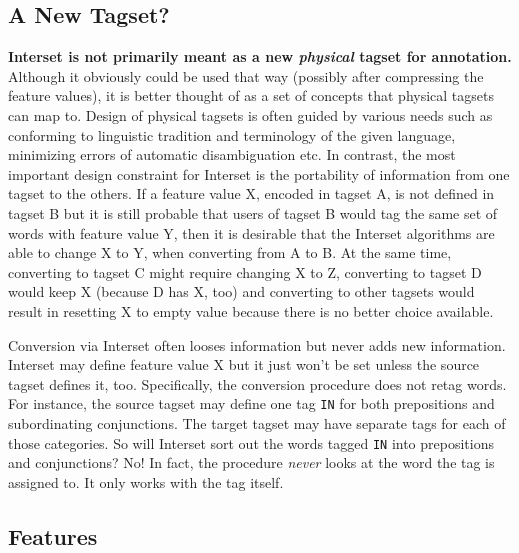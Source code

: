 \documentclass[11pt]{article}
\begin{document}
\subsection{A New Tagset?}
\label{sec:notatagset}

\textbf{Interset is not primarily meant as a new \textit{physical} tagset for annotation.} Although it obviously could be used that way (possibly after compressing the feature values), it is better thought of as a set of concepts that physical tagsets can map to. Design of physical tagsets is often guided by various needs such as conforming to linguistic tradition and terminology of the given language, minimizing errors of automatic disambiguation etc. In contrast, the most important design constraint for Interset is the portability of information from one tagset to the others. If a feature value X, encoded in tagset A, is not defined in tagset B but it is still probable that users of tagset B would tag the same set of words with feature value Y, then it is desirable that the Interset algorithms are able to change X to Y, when converting from A to B. At the same time, converting to tagset C might require changing X to Z, converting to tagset D would keep X (because D has X, too) and converting to other tagsets would result in resetting X to empty value because there is no better choice available.

Conversion via Interset often looses information but never adds new information. Interset may define feature value X but it just won't be set unless the source tagset defines it, too. Specifically, the conversion procedure does not retag words. For instance, the source tagset may define one tag \texttt{IN} for both prepositions and subordinating conjunctions. The target tagset may have separate tags for each of those categories. So will Interset sort out the words tagged \texttt{IN} into prepositions and conjunctions? No! In fact, the procedure \textit{never} looks at the word the tag is assigned to. It only works with the tag itself.

\subsection{Features}
\label{sec:features}
\end{document}
